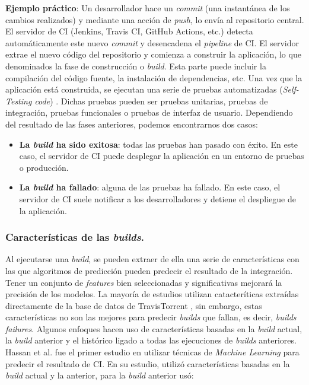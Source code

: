 \textbf{Ejemplo práctico}: Un desarrollador hace un \textit{commit} (una
instantánea de los cambios realizados) y mediante una acción de \textit{push}, lo envía al
repositorio central. El servidor de CI \cite{9} (Jenkins, Travis CI, GitHub Actions,
etc.) detecta automáticamente este nuevo \textit{commit} y desencadena el \textit{pipeline} de
CI. El servidor extrae el nuevo código del repositorio y comienza a construir la
aplicación, lo que denominados la fase de construcción o \textit{build}. Esta parte puede incluir
la compilación del código fuente, la instalación de dependencias, etc. Una vez que la aplicación
está construida, se ejecutan una serie de pruebas automatizadas (\textit{Self-Testing code})
\cite{10}. Dichas pruebas pueden ser pruebas unitarias, pruebas de integración, pruebas
funcionales o pruebas de interfaz de usuario. Dependiendo del resultado de las fases anteriores,
podemos encontrarnos dos casos:

\begin{itemize}
    \item \textbf{La \textit{build} ha sido exitosa}: todas las pruebas han pasado con éxito. En
          este caso, el servidor de CI puede desplegar la aplicación en un entorno de
          pruebas o producción.\\
    \item \textbf{La \textit{build} ha fallado}: alguna de las pruebas ha fallado. En este caso,
          el servidor de CI suele notificar a los desarrolladores y detiene el
          despliegue de la aplicación.
\end{itemize}


\subsubsection{Características de las \textit{builds}.} \label{sec:features}
Al ejecutarse una \textit{build}, se pueden extraer de ella una serie de características con las
que algoritmos de predicción pueden predecir el resultado de la integración. Tener un conjunto
de \textit{features} bien seleccionadas y significativas mejorará la precisión de los modelos.
La mayoría de estudios utilizan catacteríticas extraídas directamente de la base de datos de
TravisTorrent \cite{6}, sin embargo, estas características no son las mejores para predecir
\textit{builds} que fallan, es decir, \textit{builds failures}. Algunos enfoques \cite{6,7}
hacen uso de características basadas en la \textit{build} actual, la \textit{build} anterior y
el histórico ligado a todas las ejecuciones de \textit{builds} anteriores. Hassan et al. \cite{7}
fue el primer estudio en utilizar técnicas de \textit{Machine Learning} para predecir el resultado
de CI. En su estudio, utilizó características basadas en la \textit{build} actual y la
anterior, para la \textit{build} anterior usó:

